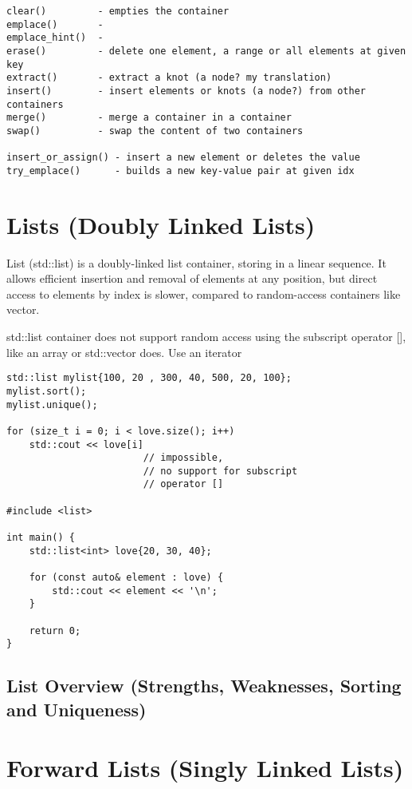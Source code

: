 \documentclass[openany]{report}
\begin{document}
\begin{verbatim}
clear()         - empties the container
emplace()       -    
emplace_hint()  -  
erase()         - delete one element, a range or all elements at given key
extract()       - extract a knot (a node? my translation)
insert()        - insert elements or knots (a node?) from other containers
merge()         - merge a container in a container 
swap()          - swap the content of two containers 

insert_or_assign() - insert a new element or deletes the value
try_emplace()      - builds a new key-value pair at given idx
\end{verbatim}

\section{Lists (Doubly Linked Lists)}

List (std::list) is a doubly-linked list container, storing in a linear sequence. 
It allows efficient insertion and removal of elements at any position, 
but direct access to elements by index is slower,
compared to random-access containers like vector.

std::list container does not support random access using the subscript operator [],
like an array or std::vector does. Use an iterator

\begin{verbatim}
std::list mylist{100, 20 , 300, 40, 500, 20, 100};
mylist.sort();
mylist.unique();

for (size_t i = 0; i < love.size(); i++)
    std::cout << love[i] 
                        // impossible, 
                        // no support for subscript
                        // operator []

#include <list>

int main() {
    std::list<int> love{20, 30, 40};

    for (const auto& element : love) {
        std::cout << element << '\n';
    }

    return 0;
}
\end{verbatim}

\subsection{List Overview (Strengths, Weaknesses, Sorting and Uniqueness)}

\section{Forward Lists (Singly Linked Lists)}
\end{document}
